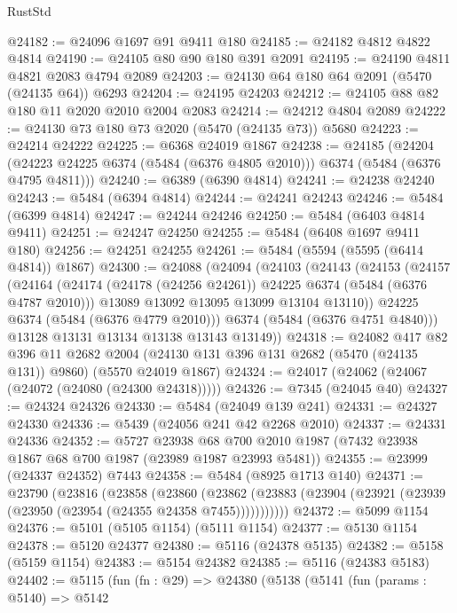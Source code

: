 \begin{lexlean}{RustStd}
\begin{coremodule}
{\begin{coremodule}
{{{{{{{{{{{{{{{{{{{{{{{{{{{{{{{@24182 := @24096 @1697 @91 @9411 @180
@24185 := @24182 @4812 @4822 @4814
@24190 := @24105 @80 @90 @180 @391 @2091
@24195 := @24190 @4811 @4821 @2083 @4794 @2089
@24203 := @24130 @64 @180 @64 @2091 (@5470 (@24135 @64)) @6293
@24204 := @24195 @24203
@24212 := @24105 @88 @82 @180 @11 @2020 @2010 @2004 @2083
@24214 := @24212 @4804 @2089
@24222 := @24130 @73 @180 @73 @2020 (@5470 (@24135 @73)) @5680
@24223 := @24214 @24222
@24225 := @6368 @24019 @1867
@24238 := @24185
    (@24204 (@24223 @24225 @6374 (@5484 (@6376 @4805 @2010))) @6374 (@5484 (@6376 @4795 @4811)))
@24240 := @6389 (@6390 @4814)
@24241 := @24238 @24240
@24243 := @5484 (@6394 @4814)
@24244 := @24241 @24243
@24246 := @5484 (@6399 @4814)
@24247 := @24244 @24246
@24250 := @5484 (@6403 @4814 @9411)
@24251 := @24247 @24250
@24255 := @5484 (@6408 @1697 @9411 @180)
@24256 := @24251 @24255
@24261 := @5484 (@5594 (@5595 (@6414 @4814)) @1867)
@24300 := @24088
    (@24094
      (@24103
        (@24143
          (@24153
            (@24157
              (@24164
                (@24174 (@24178 (@24256 @24261)) @24225 @6374 (@5484 (@6376 @4787 @2010)))
                @13089
                @13092
                @13095
                @13099
                @13104
                @13110))
            @24225
            @6374
            (@5484 (@6376 @4779 @2010)))
          @6374
          (@5484 (@6376 @4751 @4840)))
        @13128
        @13131
        @13134
        @13138
        @13143
        @13149))
@24318 := @24082
    @417
    @82
    @396
    @11
    @2682
    @2004
    (@24130 @131 @396 @131 @2682 (@5470 (@24135 @131)) @9860)
    (@5570 @24019 @1867)
@24324 := @24017 (@24062 (@24067 (@24072 (@24080 (@24300 @24318)))))
@24326 := @7345 (@24045 @40)
@24327 := @24324 @24326
@24330 := @5484 (@24049 @139 @241)
@24331 := @24327 @24330
@24336 := @5439 (@24056 @241 @42 @2268 @2010)
@24337 := @24331 @24336
@24352 := @5727
    @23938
    @68
    @700
    @2010
    @1987
    (@7432 @23938 @1867 @68 @700 @1987 (@23989 @1987 @23993 @5481))
@24355 := @23999 (@24337 @24352) @7443
@24358 := @5484 (@8925 @1713 @140)
@24371 := @23790
    (@23816
      (@23858
        (@23860
          (@23862 (@23883 (@23904 (@23921 (@23939 (@23950 (@23954 (@24355 @24358 @7455)))))))))))
@24372 := @5099 @1154
@24376 := @5101 (@5105 @1154) (@5111 @1154)
@24377 := @5130 @1154
@24378 := @5120 @24377
@24380 := @5116 (@24378 @5135)
@24382 := @5158 (@5159 @1154)
@24383 := @5154 @24382
@24385 := @5116 (@24383 @5183)
@24402 := @5115
    (fun (fn : @29) =>
    @24380
      (@5138
        (@5141
          (fun (params : @5140) =>
          @5142
}}}}}}}}}}}}}}}}}}}}}}}}}}}}}}}
\end{coremodule}}
\end{coremodule}
\end{lexlean}
